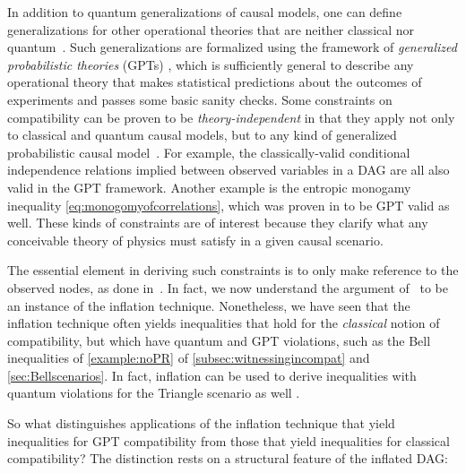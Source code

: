 {In addition to quantum generalizations of causal models, one can define generalizations for other operational theories that are neither classical nor quantum~\cite{pusey2014gdag,BeyondBellII}.
Such generalizations are formalized using the framework of {\em generalized probabilistic theories} (GPTs) \cite{Barnum2012GPT,Janotta2014GPT}, which is sufficiently general to describe any operational theory that makes statistical predictions about the outcomes of experiments and passes some basic sanity checks.  Some constraints on compatibility can be proven to be \emph{theory-independent} in that they apply not only to classical and quantum causal models, but to any kind of generalized probabilistic causal model~\cite{pusey2014gdag}. For example, the classically-valid conditional independence relations implied between observed variables in a DAG are all also valid in the GPT framework.
Another example is the entropic monogamy inequality \cref{eq:monogomyofcorrelations}, which was proven in \cite{pusey2014gdag} to be GPT valid as well. These kinds of constraints are of interest because they clarify what any conceivable theory of physics must satisfy in a given causal scenario. 

The essential element in deriving such constraints is to only make reference to the observed nodes, as done in~\cite{pusey2014gdag}. In fact, we now understand the argument of~\cite{pusey2014gdag} to be an instance of the inflation technique. Nonetheless, we have seen that the inflation technique often yields inequalities that hold for the {\em classical} notion of compatibility, but which have quantum and GPT violations, such as the Bell inequalities of \cref{example:noPR} of \cref{subsec:witnessingincompat} and \cref{sec:Bellscenarios}. In fact, inflation can be used to derive inequalities with quantum violations for the Triangle scenario as well \cite{TC2016trianglequantum}.

So what distinguishes applications of the inflation technique that yield inequalities for GPT compatibility from those that yield inequalities for classical compatibility?   The distinction rests on a structural feature of the inflated DAG:

}
